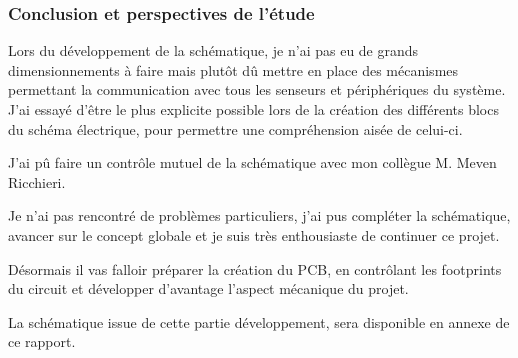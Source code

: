 {	\clearpage
	\subsubsection{Conclusion et perspectives de l'étude} \label{sssec:conclusionEtude}
	{
		Lors du développement de la schématique, je n'ai pas eu de grands dimensionnements à faire mais plutôt dû mettre en place des mécanismes permettant la communication avec tous les senseurs et périphériques du système. J'ai essayé d'être le plus explicite possible lors de la création des différents blocs du schéma électrique, pour permettre une compréhension aisée de celui-ci. 
		
		J'ai pû faire un contrôle mutuel de la schématique avec mon collègue M. Meven Ricchieri.
		
		Je n'ai pas rencontré de problèmes particuliers, j'ai pus compléter la schématique, avancer sur le concept globale et je suis très enthousiaste de continuer ce projet.
		
		Désormais il vas falloir préparer la création du PCB, en contrôlant les footprints du circuit et développer d'avantage l'aspect mécanique du projet.
		
		La schématique issue de cette partie développement,  sera disponible en annexe de ce rapport.
		
		
	}
	

}


\clearpage